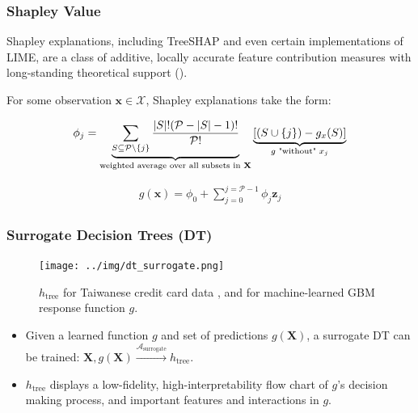\documentclass[11pt,aspectratio=169,hyperref={colorlinks}]{beamer}
\begin{document}
	\begin{frame}
	
		\frametitle{Shapley Value}	
	
		Shapley explanations, including TreeSHAP and even certain implementations of LIME, are a class of additive, locally accurate feature contribution measures with long-standing theoretical support (\cite{shapley}). 
	
		\vspace{8pt}
	
		For some observation $\mathbf{x} \in \mathcal{X}$, Shapley explanations take the form:
	
		\begin{equation}
		\label{eq:shap_contrib}
		\begin{aligned}
		\phi_{j} = \underbrace{\sum_{S \subseteq \mathcal{P} \setminus \{j\}}\frac{|S|!(\mathcal{P} -|S| -1)!}{\mathcal{P}!}}_\text{weighted average over all subsets in \textbf{X}}\underbrace{[(S \cup \{j\}) - g_x(S)]}_{g\text{ "without" }x_j}
		\end{aligned}
		\end{equation}
		
		\begin{equation}
		\label{eq:shap_additive}
		\begin{aligned}
		g(\mathbf{x}) = \phi_0 + \sum_{j=0}^{j=\mathcal{P} - 1} \phi_j \mathbf{z}_j
		\end{aligned}
		\end{equation}
	
	\end{frame}

	\begin{frame}[t]
	
		\frametitle{Surrogate Decision Trees (DT)}
		
		\begin{figure}[htb]
			\begin{center}
				\texttt{[image: ../img/dt\_surrogate.png]}
				\label{fig:dt_surrogate}
				\caption{$h_{\text{tree}}$ for Taiwanese credit card data \cite{uci}, and for machine-learned GBM response function $g$.}
			\end{center}
		\end{figure}
		
		\vspace{-20 pt}
		
		\begin{itemize}
			
			\item Given a learned function $g$ and set of predictions $g(\mathbf{X})$, a surrogate DT can be trained: $ \mathbf{X}, g(\mathbf{X}) \xrightarrow{\mathcal{A}_{\text{surrogate}}} h_{\text{tree}}$.
			
			\item $h_{\text{tree}}$ displays a low-fidelity, high-interpretability flow chart of $g$'s decision making process, and important features and interactions in $g$.	
			
		\end{itemize}
		
	\end{frame}
	
\end{document}
